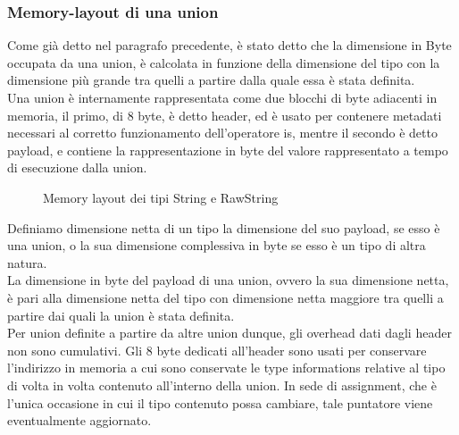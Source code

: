 \subsubsection{Memory-layout di una union}
Come già detto nel paragrafo precedente, è stato detto che la dimensione in Byte occupata da una union, è calcolata in funzione della dimensione 
del tipo con la dimensione più grande tra quelli a partire dalla quale essa è stata definita. \\

Una union è internamente rappresentata come due blocchi di byte adiacenti in memoria, il primo, di 8 byte, è detto header, ed è usato per 
contenere metadati necessari al corretto funzionamento dell’operatore is, mentre il secondo è detto payload, e contiene la rappresentazione 
in byte del valore rappresentato a tempo di esecuzione dalla union. \\
 
\begin{figure}[htbp]
    \centering
    \caption{Memory layout dei tipi String e RawString}
    \label{fig:string_mem_layout}
\end{figure}

Definiamo dimensione netta di un tipo la dimensione del suo payload, se esso è una union, o 
la sua dimensione complessiva in byte se esso è un tipo di altra natura. \\

La dimensione in byte del payload di una union, ovvero la sua dimensione netta, è pari alla 
dimensione netta del tipo con dimensione netta maggiore tra quelli a partire dai quali la union è stata definita. \\

Per union definite a partire da altre union dunque, gli overhead dati dagli header non sono cumulativi. Gli 8 
byte dedicati all’header sono usati per conservare l’indirizzo in memoria a cui sono conservate le type informations 
relative al tipo di volta in volta contenuto all’interno della union. In sede di assignment, che è l’unica occasione 
in cui il tipo contenuto possa cambiare, tale puntatore viene eventualmente aggiornato. \\

